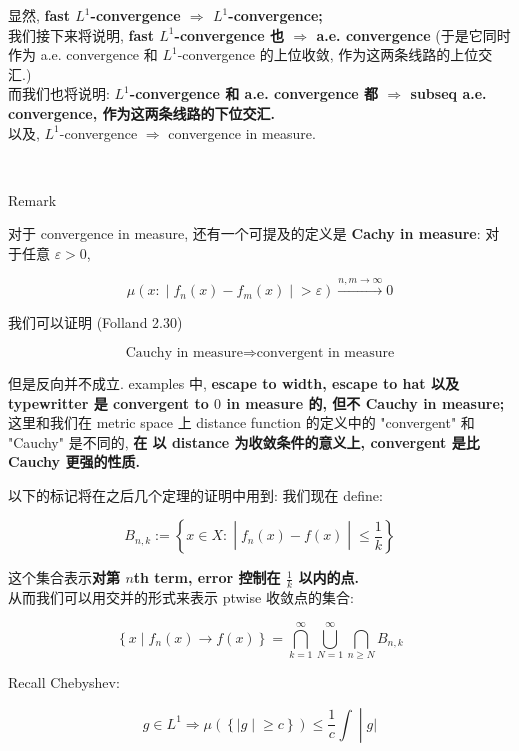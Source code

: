 显然, \textbf{fast \(L^{1}\)-convergence \(\Longrightarrow\) \(L^{1}\)-convergence;}\\
我们接下来将说明, \textbf{fast \(L^{1}\)-convergence 也 \(\Longrightarrow\) a.e. convergence} (于是它同时作为 a.e. convergence 和 \(L^{1}\)-convergence 的上位收敛, 作为这两条线路的上位交汇.)\\
而我们也将说明: \textbf{\(L^{1}\)-convergence 和 a.e. convergence 都 \(\Longrightarrow\) subseq a.e. convergence, 作为这两条线路的下位交汇.}\\
以及, \(L^{1}\)-convergence \(\Longrightarrow\) convergence in measure.\\
\strut \\

\begin{qlremark}{Remark}

对于 convergence in measure, 还有一个可提及的定义是 \textbf{Cachy in measure}: 对于任意 \(\varepsilon > 0\),

\[\left. \mu(x: \middle| f_{n}(x) - f_{m}(x) \middle| > \varepsilon)\overset{n,m\rightarrow\infty}{\rightarrow}0 \right.\]

我们可以证明 (Folland 2.30)

\[\text{Cauchy in measure}\Longrightarrow\text{convergent in measure}\]

但是反向并不成立. examples 中, \textbf{escape to width, escape to hat 以及 typewritter 是 convergent to \(0\) in measure 的, 但不 Cauchy in measure;}\\
这里和我们在 metric space 上 distance function 的定义中的 "convergent" 和 "Cauchy" 是不同的, \textbf{在 以 distance 为收敛条件的意义上, convergent 是比 Cauchy 更强的性质.}

\end{qlremark}

以下的标记将在之后几个定理的证明中用到: 我们现在 define:

\[B_{n,k} := \left\{ x \in X: \middle| f_{n}(x) - f(x) \middle| \leq \frac{1}{k} \right\}\]

这个集合表示\textbf{对第 \(n\)th term, error 控制在 \(\frac{1}{k}\) 以内的点.}\\
从而我们可以用交并的形式来表示 ptwise 收敛点的集合:

\[\left\{ {x \mid f_{n}(x)\rightarrow f(x)} \right\} = \bigcap\limits_{k = 1}^{\infty}\bigcup\limits_{N = 1}^{\infty}\bigcap\limits_{n \geq N}B_{n,k}\]

Recall Chebyshev:

\[\left. g \in L^{1}\Longrightarrow\mu(\left\{ |g \middle| \geq c \right\}) \leq \frac{1}{c}\int \middle| g| \right.\]

